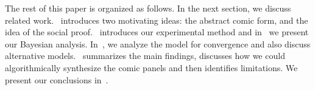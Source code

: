 The rest of this paper is organized as follows. In the next section, we discuss related work.~ introduces two motivating ideas: the abstract comic form, and the idea of the social proof.~ introduces our experimental method and in~ we present our Bayesian analysis. In~, we analyze the model for convergence and also discuss alternative models.~ summarizes the main findings, discusses how we could algorithmically synthesize the comic panels and then identifies limitations. We present our conclusions in~. 
